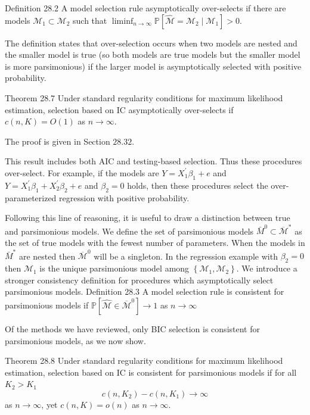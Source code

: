 \documentclass[10pt]{article}
\begin{document}
Definition 28.2 A model selection rule asymptotically over-selects if there are models $\mathscr{M}_{1} \subset \mathscr{M}_{2}$ such that $\liminf _{n \rightarrow \infty} \mathbb{P}\left[\widehat{\mathscr{M}}=\mathscr{M}_{2} \mid \mathscr{M}_{1}\right]>0$.

The definition states that over-selection occurs when two models are nested and the smaller model is true (so both models are true models but the smaller model is more parsimonious) if the larger model is asymptotically selected with positive probability.

Theorem 28.7 Under standard regularity conditions for maximum likelihood estimation, selection based on IC asymptotically over-selects if $c(n, K)=O(1)$ as $n \rightarrow \infty$.

The proof is given in Section $28.32$.

This result includes both AIC and testing-based selection. Thus these procedures over-select. For example, if the models are $Y=X_{1}^{\prime} \beta_{1}+e$ and $Y=X_{1}^{\prime} \beta_{1}+X_{2}^{\prime} \beta_{2}+e$ and $\beta_{2}=0$ holds, then these procedures select the over-parameterized regression with positive probability.

Following this line of reasoning, it is useful to draw a distinction between true and parsimonious models. We define the set of parsimonious models $\bar{M}^{0} \subset \overline{\mathscr{M}}^{*}$ as the set of true models with the fewest number of parameters. When the models in $\bar{M}^{*}$ are nested then $\overline{\mathscr{M}}^{0}$ will be a singleton. In the regression example with $\beta_{2}=0$ then $\mathscr{M}_{1}$ is the unique parsimonious model among $\left\{\mathscr{M}_{1}, \mathscr{M}_{2}\right\}$. We introduce a stronger consistency definition for procedures which asymptotically select parsimonious models. Definition 28.3 A model selection rule is consistent for parsimonious models if $\mathbb{P}\left[\widehat{\mathscr{M}} \in \overline{\mathscr{M}}^{0}\right] \rightarrow 1$ as $n \rightarrow \infty$

Of the methods we have reviewed, only BIC selection is consistent for parsimonious models, as we now show.

Theorem 28.8 Under standard regularity conditions for maximum likelihood estimation, selection based on IC is consistent for parsimonious models if for all $K_{2}>K_{1}$
$$
c\left(n, K_{2}\right)-c\left(n, K_{1}\right) \rightarrow \infty
$$
as $n \rightarrow \infty$, yet $c(n, K)=o(n)$ as $n \rightarrow \infty$.
\end{document}
